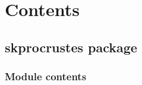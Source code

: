 \documentclass[a4paper,10pt,english]{sphinxmanual}
\begin{document}
\chapter{Contents}
\label{\detokenize{index:contents}}

\section{skprocrustes package}
\label{\detokenize{skprocrustes:skprocrustes-package}}\label{\detokenize{skprocrustes::doc}}

\subsection{Module contents}
\label{\detokenize{skprocrustes:module-skprocrustes}}\label{\detokenize{skprocrustes:module-contents}}
\end{document}
